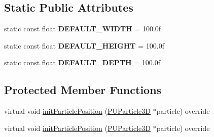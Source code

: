 \subsection*{Static Public Attributes}
\begin{DoxyCompactItemize}
\item 
\mbox{\label{classCCPUBoxEmitter_adeca1779c9bd8b8350a23d23b83299e1}} 
static const float {\bfseries D\+E\+F\+A\+U\+L\+T\+\_\+\+W\+I\+D\+TH} = 100.\+0f
\item 
\mbox{\label{classCCPUBoxEmitter_a097108c2944a536c015bfc8d8ffab8c4}} 
static const float {\bfseries D\+E\+F\+A\+U\+L\+T\+\_\+\+H\+E\+I\+G\+HT} = 100.\+0f
\item 
\mbox{\label{classCCPUBoxEmitter_ae7c34243c8b0f46a322d982c2c2462e5}} 
static const float {\bfseries D\+E\+F\+A\+U\+L\+T\+\_\+\+D\+E\+P\+TH} = 100.\+0f
\end{DoxyCompactItemize}
\subsection*{Protected Member Functions}
\begin{DoxyCompactItemize}
\item 
virtual void \hyperlink{classCCPUBoxEmitter_ad3f50a904d4f27ce0b40d5e9ccfad9c9}{init\+Particle\+Position} (\hyperlink{structPUParticle3D}{P\+U\+Particle3D} $\ast$particle) override
\item 
virtual void \hyperlink{classCCPUBoxEmitter_a405d3a333bd6e513a38f1b318163f969}{init\+Particle\+Position} (\hyperlink{structPUParticle3D}{P\+U\+Particle3D} $\ast$particle) override
\end{DoxyCompactItemize}
